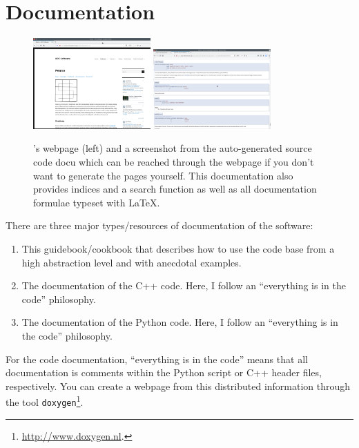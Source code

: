 \section{Documentation}

\begin{figure}
 \begin{center}
  \includegraphics[width=0.4\textwidth]{10_installation/webpage.png}
  \hspace{0.4cm}
  \includegraphics[width=0.4\textwidth]{10_installation/source-docu.png}
 \end{center}
 \caption{
  \Peano's webpage (left) and a screenshot from the auto-generated source code
  docu which can be reached through the webpage if you don't want to generate
  the pages yourself.
  This documentation also provides indices and a search function as well as all
  documentation formulae typeset with LaTeX.
 }
\end{figure}



There are three major types/resources of documentation of the software:
\begin{enumerate}
  \item This guidebook/cookbook that describes how to use the code base from a
  high abstraction level and with anecdotal examples.
  \item The documentation of the C++ code. Here, I follow an ``everything is in
  the code'' philosophy.
  \item The documentation of the Python code. Here, I follow an ``everything is
  in the code'' philosophy.
\end{enumerate}

\noindent
For the code documentation, ``everything is in the code'' means that all
documentation is comments within the Python script or C++ header files,
respectively.
You can create a webpage from this distributed information through
the tool \texttt{doxygen}\footnote{\url{http://www.doxygen.nl}.}. 


